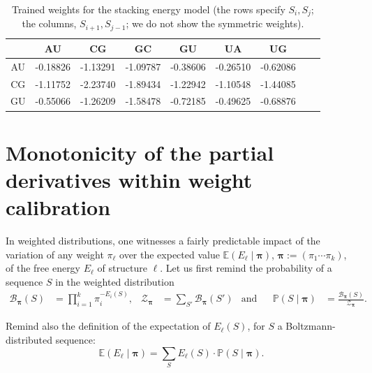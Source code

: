 \documentclass{bioinfo}
\newcommand{\partfun}[1]{\mathcal{Z}_{#1}}
\begin{document}
\begin{table}
  \centering
  \caption{Trained weights for the stacking energy model (the rows specify $S_i,S_j$; the columns, $S_{i+1},S_{j-1}$; we do not show the symmetric weights).}
  \label{tab:stackingmodel}
  \begin{tabular}{c@{\quad}|@{\quad}c@{\quad}c@{\quad}c@{\quad}c@{\quad}c@{\quad}c@{\quad}c@{\quad}c}
       & AU & CG & GC & GU & UA & UG \\\hline
    AU &
-0.18826 &
-1.13291 &
-1.09787 &
-0.38606 &
-0.26510 &
-0.62086
    \\
    CG &
-1.11752 &
-2.23740 &
-1.89434 &
-1.22942 &
-1.10548 &
-1.44085
    \\
    GU &
-0.55066 &
-1.26209 &
-1.58478 &
-0.72185 &
-0.49625 &
-0.68876
    \\
  \end{tabular}
\end{table}

\section{Monotonicity of the partial derivatives within weight calibration}
\label{sec:weight_derivatives}
%
In weighted distributions, one witnesses a fairly predictable impact of the variation of any weight $\pi_\ell$ over the expected value $\mathbb{E}(E_\ell\mid \pmb{\pi})$, $\pmb{\pi}:= (\pi_1\cdots\pi_k)$, of the free energy $E_\ell$ of structure $\ell$.  Let us  first remind the probability of a sequence $S$ in the weighted distribution
\begin{align*} 
  \mathcal{B}_{\pmb{\pi}}(S) &= \prod_{i=1}^{k} \pi_i^{-E_i(S)}, &
  \partfun{\pmb{\pi}}&=\sum_{S'}\mathcal{B}_{\pmb{\pi}}(S') &
    \text{and}& &
  \mathbb{P}(S\mid \pmb{\pi}) &= \frac{\mathcal{B}_{\pmb{\pi}}(S)}{\partfun{\pmb{\pi}}}.
  \end{align*}
  
Remind also the definition of the expectation of $E_\ell(S)$, for $S$ a Boltzmann-distributed sequence:
$$\mathbb{E}(E_\ell\mid \pmb{\pi}) = \sum_S E_\ell(S)\cdot \mathbb{P}(S\mid \pmb{\pi}).$$
\end{document}
